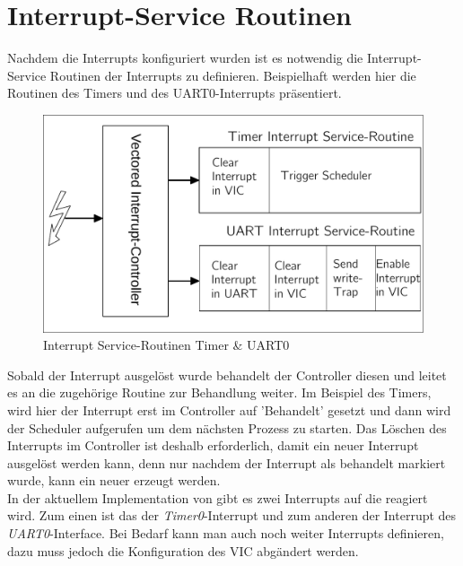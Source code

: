 \section{Interrupt-Service Routinen}
Nachdem die Interrupts konfiguriert wurden ist es notwendig die Interrupt-Service Routinen der Interrupts zu definieren. Beispielhaft werden hier die Routinen des Timers und des UART0-Interrupts pr\"asentiert.
\begin{figure}[H]
	\begin{center}	
	\caption{Interrupt Service-Routinen Timer \& UART0}
	\includegraphics[scale=0.60]{common/isr.pdf}
	\end{center}
\end{figure}
\noindent
Sobald der Interrupt ausgel\"ost wurde behandelt der Controller diesen und leitet es an die zugeh\"orige Routine zur Behandlung weiter. Im Beispiel des Timers, wird hier der Interrupt erst im Controller auf 'Behandelt' gesetzt und dann wird der Scheduler aufgerufen um dem n\"achsten Prozess zu starten. Das L\"oschen des Interrupts im Controller ist deshalb erforderlich, damit ein neuer Interrupt ausgel\"ost werden kann, denn nur nachdem der Interrupt als behandelt markiert wurde, kann ein neuer erzeugt werden. \\ In der aktuellem Implementation von \mops gibt es zwei Interrupts auf die reagiert wird. Zum einen ist das der \textit{Timer0}-Interrupt und zum anderen der Interrupt des \textit{UART0}-Interface. Bei Bedarf kann man auch noch weiter Interrupts definieren, dazu muss jedoch die Konfiguration des VIC abg\"andert werden.
\newpage
